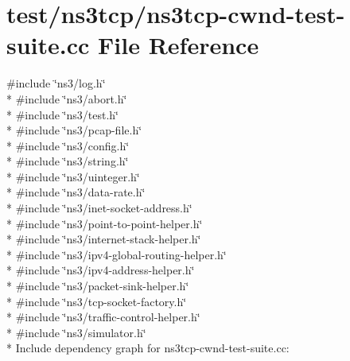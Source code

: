 \hypertarget{ns3tcp-cwnd-test-suite_8cc}{}\section{test/ns3tcp/ns3tcp-\/cwnd-\/test-\/suite.cc File Reference}
\label{ns3tcp-cwnd-test-suite_8cc}
{\ttfamily \#include \char`\"{}ns3/log.\+h\char`\"{}}\\*
{\ttfamily \#include \char`\"{}ns3/abort.\+h\char`\"{}}\\*
{\ttfamily \#include \char`\"{}ns3/test.\+h\char`\"{}}\\*
{\ttfamily \#include \char`\"{}ns3/pcap-\/file.\+h\char`\"{}}\\*
{\ttfamily \#include \char`\"{}ns3/config.\+h\char`\"{}}\\*
{\ttfamily \#include \char`\"{}ns3/string.\+h\char`\"{}}\\*
{\ttfamily \#include \char`\"{}ns3/uinteger.\+h\char`\"{}}\\*
{\ttfamily \#include \char`\"{}ns3/data-\/rate.\+h\char`\"{}}\\*
{\ttfamily \#include \char`\"{}ns3/inet-\/socket-\/address.\+h\char`\"{}}\\*
{\ttfamily \#include \char`\"{}ns3/point-\/to-\/point-\/helper.\+h\char`\"{}}\\*
{\ttfamily \#include \char`\"{}ns3/internet-\/stack-\/helper.\+h\char`\"{}}\\*
{\ttfamily \#include \char`\"{}ns3/ipv4-\/global-\/routing-\/helper.\+h\char`\"{}}\\*
{\ttfamily \#include \char`\"{}ns3/ipv4-\/address-\/helper.\+h\char`\"{}}\\*
{\ttfamily \#include \char`\"{}ns3/packet-\/sink-\/helper.\+h\char`\"{}}\\*
{\ttfamily \#include \char`\"{}ns3/tcp-\/socket-\/factory.\+h\char`\"{}}\\*
{\ttfamily \#include \char`\"{}ns3/traffic-\/control-\/helper.\+h\char`\"{}}\\*
{\ttfamily \#include \char`\"{}ns3/simulator.\+h\char`\"{}}\\*
Include dependency graph for ns3tcp-\/cwnd-\/test-\/suite.cc\+:
